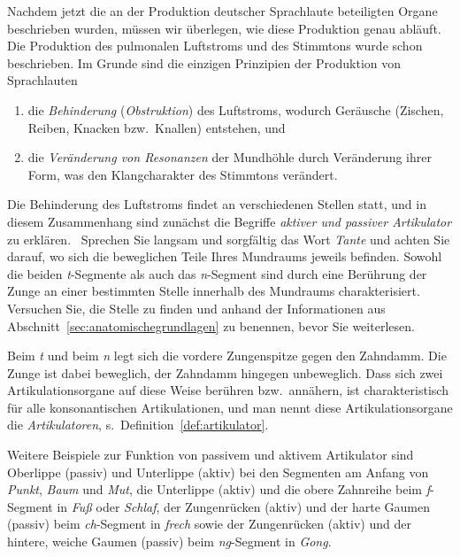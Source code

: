 Nachdem jetzt die an der Produktion deutscher Sprachlaute beteiligten Organe beschrieben wurden, müssen wir überlegen, wie diese Produktion genau abläuft.
Die Produktion des pulmonalen Luftstroms und des Stimmtons wurde schon beschrieben.
Im Grunde sind die einzigen Prinzipien der Produktion von Sprachlauten

\begin{enumerate}\Lf
  \item die \textit{Behinderung} (\textit{Obstruktion}) des Luftstroms, wodurch Geräusche (Zischen, Reiben, Knacken bzw.\ Knallen) entstehen, und
  \item die \textit{Veränderung von Resonanzen} der Mundhöhle durch Veränderung ihrer Form, was den Klangcharakter des Stimmtons verändert.
\end{enumerate}

Die Behinderung des Luftstroms findet an verschiedenen Stellen statt, und in diesem Zusammenhang sind zunächst die Begriffe \textit{aktiver und passiver Artikulator} zu erklären.
\TuBegin~Sprechen Sie langsam und sorgfältig das Wort \textit{Tante} und achten Sie darauf, wo sich die beweglichen Teile Ihres Mundraums jeweils befinden.
Sowohl die beiden \textit{t}-Segmente als auch das \textit{n}-Segment sind durch eine Berührung der Zunge an einer bestimmten Stelle innerhalb des Mundraums charakterisiert.
Versuchen Sie, die Stelle zu finden und anhand der Informationen aus Abschnitt~\ref{sec:anatomischegrundlagen} zu benennen, bevor Sie weiterlesen.

Beim \textit{t} und beim \textit{n} legt sich die vordere Zungenspitze gegen den Zahndamm.
Die Zunge ist dabei beweglich, der Zahndamm hingegen unbeweglich.
Dass sich zwei Artikulationsorgane auf diese Weise berühren bzw.\ annähern, ist charakteristisch für alle konsonantischen Artikulationen, und man nennt diese Artikulationsorgane die \textit{Artikulatoren}, s.\ Definition~\ref{def:artikulator}.


Weitere Beispiele zur Funktion von passivem und aktivem Artikulator sind Oberlippe (passiv) und Unterlippe (aktiv) bei den Segmenten am Anfang von \textit{Punkt}, \textit{Baum} und \textit{Mut}, die Unterlippe (aktiv) und die obere Zahnreihe beim \textit{f}-Segment in \textit{Fuß} oder \textit{Schlaf}, der Zungenrücken (aktiv) und der harte Gaumen (passiv) beim \textit{ch}-Segment in \textit{frech} sowie der Zungenrücken (aktiv) und der hintere, weiche Gaumen (passiv) beim \textit{ng}-Segment in \textit{Gong}.

